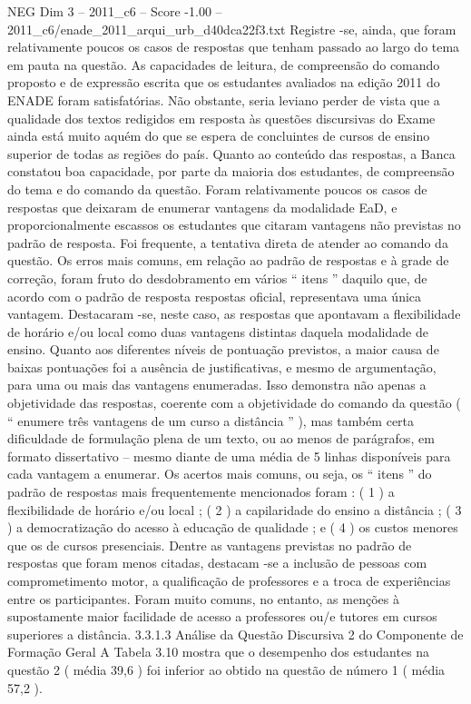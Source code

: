 \begin{textsample}{NEG Dim 3 – 2011\_c6 – Score -1.00 – 2011\_c6/enade\_2011\_arqui\_urb\_d40dca22f3.txt}
Registre -se, ainda, que foram relativamente poucos os casos de respostas que tenham passado ao largo do tema em pauta na questão.
As capacidades de leitura, de compreensão do comando proposto e de expressão escrita que os estudantes avaliados na edição 2011 do ENADE foram satisfatórias.
Não obstante, seria leviano perder de vista que a qualidade dos textos redigidos em resposta às questões discursivas do Exame ainda está muito aquém do que se espera de concluintes de cursos de ensino superior de todas as regiões do país.
Quanto ao conteúdo das respostas, a Banca constatou boa capacidade, por parte da maioria dos estudantes, de compreensão do tema e do comando da questão.
Foram relativamente poucos os casos de respostas que deixaram de enumerar vantagens da modalidade EaD, e proporcionalmente escassos os estudantes que citaram vantagens não previstas no padrão de resposta.
Foi frequente, a tentativa direta de atender ao comando da questão.
Os erros mais comuns, em relação ao padrão de respostas e à grade de correção, foram fruto do desdobramento em vários “ itens ” daquilo que, de acordo com o padrão de resposta respostas oficial, representava uma única vantagem.
Destacaram -se, neste caso, as respostas que apontavam a flexibilidade de horário e/ou local como duas vantagens distintas daquela modalidade de ensino.
Quanto aos diferentes níveis de pontuação previstos, a maior causa de baixas pontuações foi a ausência de justificativas, e mesmo de argumentação, para uma ou mais das vantagens enumeradas.
Isso demonstra não apenas a objetividade das respostas, coerente com a objetividade do comando da questão ( “ enumere três vantagens de um curso a distância ” ), mas também certa dificuldade de formulação plena de um texto, ou ao menos de parágrafos, em formato dissertativo – mesmo diante de uma média de 5 linhas disponíveis para cada vantagem a enumerar.
Os acertos mais comuns, ou seja, os “ itens ” do padrão de respostas mais frequentemente mencionados foram : ( 1 ) a flexibilidade de horário e/ou local ; ( 2 ) a capilaridade do ensino a distância ; ( 3 ) a democratização do acesso à educação de qualidade ; e ( 4 ) os custos menores que os de cursos presenciais.
Dentre as vantagens previstas no padrão de respostas que foram menos citadas, destacam -se a inclusão de pessoas com comprometimento motor, a qualificação de professores e a troca de experiências entre os participantes.
Foram muito comuns, no entanto, as menções à supostamente maior facilidade de acesso a professores ou/e tutores em cursos superiores a distância. 3.3.1.3 Análise da Questão Discursiva 2 do Componente de Formação Geral A Tabela 3.10 mostra que o desempenho dos estudantes na questão 2 ( média 39,6 ) foi inferior ao obtido na questão de número 1 ( média 57,2 ).

\end{textsample}
